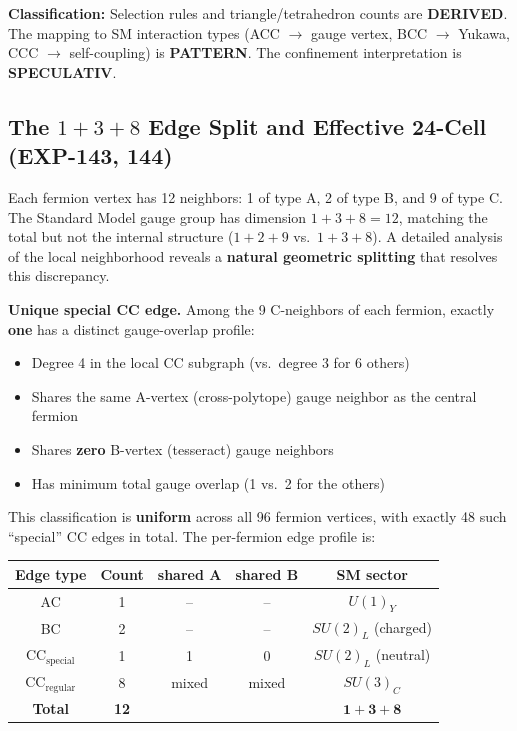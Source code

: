 \documentclass[12pt,a4paper]{article}
\begin{document}
\textbf{Classification:} Selection rules and triangle/tetrahedron counts are \textbf{DERIVED}. The mapping to SM interaction types (ACC $\to$ gauge vertex, BCC $\to$ Yukawa, CCC $\to$ self-coupling) is \textbf{PATTERN}. The confinement interpretation is \textbf{SPECULATIV}.

\subsection{The $1 + 3 + 8$ Edge Split and Effective 24-Cell (EXP-143, 144)}
\label{sec:edge_split}

Each fermion vertex has 12 neighbors: 1 of type A, 2 of type B, and 9 of type C. The Standard Model gauge group has dimension $1 + 3 + 8 = 12$, matching the total but not the internal structure ($1 + 2 + 9$ vs.\ $1 + 3 + 8$). A detailed analysis of the local neighborhood reveals a \textbf{natural geometric splitting} that resolves this discrepancy.

\textbf{Unique special CC edge.} Among the 9 C-neighbors of each fermion, exactly \textbf{one} has a distinct gauge-overlap profile:
\begin{itemize}
    \item Degree 4 in the local CC subgraph (vs.\ degree 3 for 6 others)
    \item Shares the same A-vertex (cross-polytope) gauge neighbor as the central fermion
    \item Shares \textbf{zero} B-vertex (tesseract) gauge neighbors
    \item Has minimum total gauge overlap (1 vs.\ 2 for the others)
\end{itemize}
This classification is \textbf{uniform} across all 96 fermion vertices, with exactly 48 such ``special'' CC edges in total. The per-fermion edge profile is:

\begin{center}
\begin{tabular}{ccccc}
\toprule
\textbf{Edge type} & \textbf{Count} & \textbf{shared A} & \textbf{shared B} & \textbf{SM sector} \\
\midrule
AC & 1 & -- & -- & $U(1)_Y$ \\
BC & 2 & -- & -- & $SU(2)_L$ (charged) \\
CC$_{\text{special}}$ & 1 & 1 & 0 & $SU(2)_L$ (neutral) \\
CC$_{\text{regular}}$ & 8 & mixed & mixed & $SU(3)_C$ \\
\midrule
\textbf{Total} & \textbf{12} & & & $\mathbf{1 + 3 + 8}$ \\
\bottomrule
\end{tabular}
\end{center}
\end{document}
